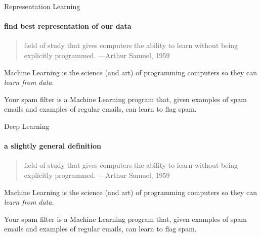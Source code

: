 \documentclass{beamer}
\begin{document}
    \begin{frame}[t]{Representation Learning}
      \framesubtitle{find best representation of our data}%
      \begin{quote}
        field of study that gives computers the ability to learn without being explicitly programmed.
        \hfill {\tiny —Arthur Samuel, 1959}
      \end{quote}
      Machine Learning is the science (and art) of programming computers so they can \textit{learn from data}. \\
      \vspace{8mm}
      \parbox{0.55\textwidth}{
      Your spam filter is a Machine Learning program that, given examples of spam emails and examples of regular emails, can learn to flag spam.
      }
    \end{frame}

    \begin{frame}[t]{Deep Learning}
      \framesubtitle{a slightly general definition}%
      \begin{quote}
        field of study that gives computers the ability to learn without being explicitly programmed.
        \hfill {\tiny —Arthur Samuel, 1959}
      \end{quote}
      Machine Learning is the science (and art) of programming computers so they can \textit{learn from data}. \\
      \vspace{8mm}
      \parbox{0.55\textwidth}{
      Your spam filter is a Machine Learning program that, given examples of spam emails and examples of regular emails, can learn to flag spam.
      }
    \end{frame}
\end{document}
